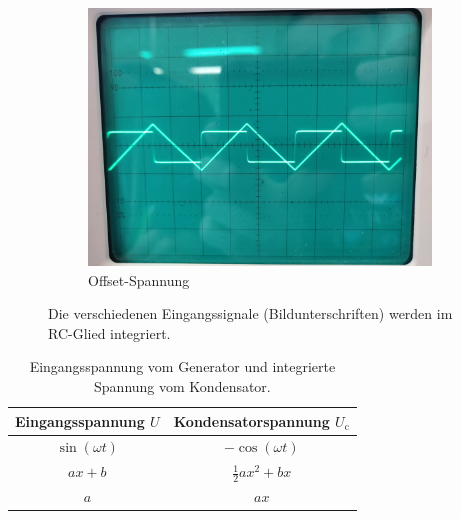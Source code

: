\begin{figure}
        \quad
        \begin{subfigure}[b]{0.475\textwidth}   
            \centering 
            \includegraphics[width=\textwidth]{content/data/rechteck2.jpg}
            \caption[]%
            {{\small Offset-Spannung}}    
            \label{fig:mean and std of net44}
        \end{subfigure}
        \caption[]
        {\small Die verschiedenen Eingangssignale (Bildunterschriften) werden im RC-Glied integriert.} 
        \label{fig:integrabel}
    \end{figure}

    \begin{table}
        \centering
        \caption{Eingangsspannung vom Generator und integrierte Spannung vom Kondensator.}
        \begin{tabular}{cc}
            \toprule
            Eingangsspannung $U$ & Kondensatorspannung $U_\text{c}$ \\
            \midrule
            $\sin(\omega t)$ & $-\cos(\omega t)$ \\
            $ax+b$ & $\frac{1}{2}ax^2+bx$ \\
            $a$ & $ax$ \\
            \bottomrule
        \end{tabular}
        \label{tab:integration}
    \end{table}